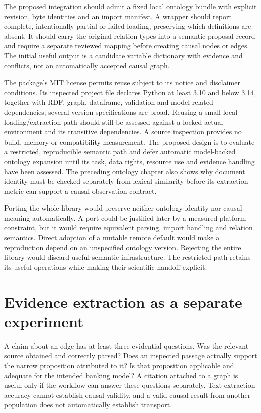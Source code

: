 The proposed integration should admit a fixed local ontology bundle with
explicit revision, byte identities and an import manifest. A wrapper
should report complete, intentionally partial or failed loading,
preserving which definitions are absent. It should carry the original
relation types into a semantic proposal record and require a separate
reviewed mapping before creating causal nodes or edges. The initial
useful output is a candidate variable dictionary with evidence and
conflicts, not an automatically accepted causal graph.

The package's MIT license permits reuse subject to its notice and
disclaimer conditions. Its inspected project file declares Python at
least 3.10 and below 3.14, together with RDF, graph, dataframe,
validation and model-related dependencies; several version
specifications are broad. Reusing a small local loading/extraction path
should still be assessed against a locked actual environment and its
transitive dependencies. A source inspection provides no build, memory
or compatibility measurement. The proposed design is to evaluate a restricted, reproducible semantic path
and defer automatic model-backed ontology expansion until its task, data
rights, resource use and evidence handling have been assessed. The preceding
ontology chapter also shows why document identity must be checked separately
from lexical similarity before its extraction metric can support a causal
observation contract.
\citep{v12_la_package_ontolearner}

Porting the whole library would preserve neither ontology identity nor
causal meaning automatically. A port could be justified later by a
measured platform constraint, but it would require equivalent parsing,
import handling and relation semantics. Direct adoption of a mutable
remote default would make a reproduction depend on an unspecified
ontology version. Rejecting the entire library would discard useful
semantic infrastructure. The restricted path retains its useful
operations while making their scientific handoff explicit.

\hypertarget{evidence-extraction-as-a-separate-experiment}{%
\section{Evidence extraction as a separate
experiment}\label{evidence-extraction-as-a-separate-experiment}}

A claim about an edge has at least three evidential questions. Was the
relevant source obtained and correctly parsed? Does an inspected passage
actually support the narrow proposition attributed to it? Is that
proposition applicable and adequate for the intended banking model? A
citation attached to a graph is useful only if the workflow can answer
these questions separately. Text extraction accuracy cannot establish
causal validity, and a valid causal result from another population does
not automatically establish transport.

